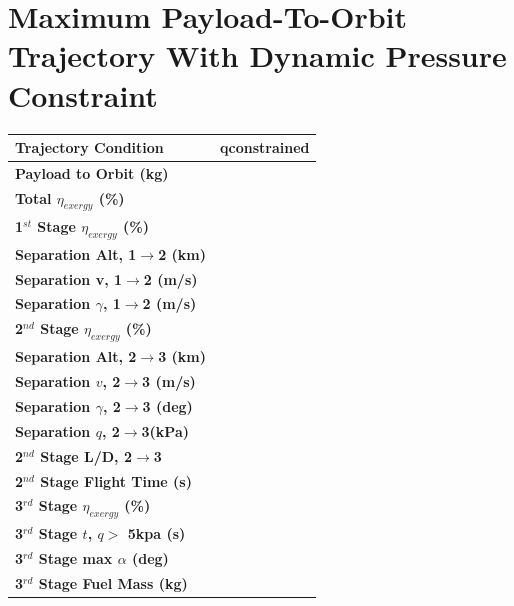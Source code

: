 		\chapter{Maximum Payload-To-Orbit Trajectory With Dynamic Pressure Constraint}\label{sec:Appendix_qconst}
	\begin{table}[ht]
	\centering
\begin{tabular}{l c } 
	\hline \textbf{Trajectory Condition}
	&qconstrained
	
	\\
	\hline \textbf{Payload to Orbit (kg)}
	& \textbf{\PayloadToOrbitqconstrained}
	\\
	\textbf{Total $\eta_{exergy}$ (\%)}
	& \textbf{\totalExergyEffqconstrained}
	\\
	\hline 
	\textbf{1$^{st}$ Stage $\eta_{exergy}$ (\%)}
	& \textbf{\firstExergyEffqconstrained}
	\\
	\textbf{Separation Alt, 1$\rightarrow$2 (km)}
	& \firstsecondSeparationAltqconstrained
	\\
	\textbf{Separation v, 1$\rightarrow$2 (m/s)}
	& \firstsecondSeparationvqconstrained
	\\
	\textbf{Separation $\gamma$, 1$\rightarrow$2 (m/s)}
	& \firstsecondSeparationgammaqconstrained
	\\
	\hline 
	\textbf{2$^{nd}$ Stage $\eta_{exergy}$ (\%)}
	& \textbf{\secondExergyEffqconstrained}
	\\
	\textbf{Separation Alt, 2$\rightarrow$3 (km)}
	& \secondthirdSeparationAltqconstrained
	\\
	\textbf{Separation $v$, 2$\rightarrow$3 (m/s)}
	& \secondthirdSeparationvqconstrained
	\\
	\textbf{Separation $\gamma$, 2$\rightarrow$3 (deg)}
	& \secondthirdSeparationgammaqconstrained
	\\
	\textbf{Separation $q$, 2$\rightarrow$3(kPa)}
	& \secondthirdSeparationqqconstrained
	\\
	\textbf{2$^{nd}$ Stage L/D, 2$\rightarrow$3}
	& \secondthirdSeparationLDqconstrained
	\\
	\textbf{2$^{nd}$ Stage Flight Time (s)}
	& \secondFlightTimeqconstrained
	\\
	\hline 
	\textbf{3$^{rd}$ Stage $\eta_{exergy}$ (\%)}
	& \textbf{\thirddExergyEffqconstrained}
	\\
	\textbf{3$^{rd}$ Stage $t$, $q >$ 5kpa (s)}
	& \thirdqOverFiveqconstrained
	\\
	\textbf{3$^{rd}$ Stage max $\alpha$ (deg)}
	& \thirdmaxAoAqconstrained
	\\
	\textbf{3$^{rd}$ Stage Fuel Mass (kg)}
	& \thirdmFuelqconstrained
	\\
	\hline 
\end{tabular} 

	\end{table}
		
